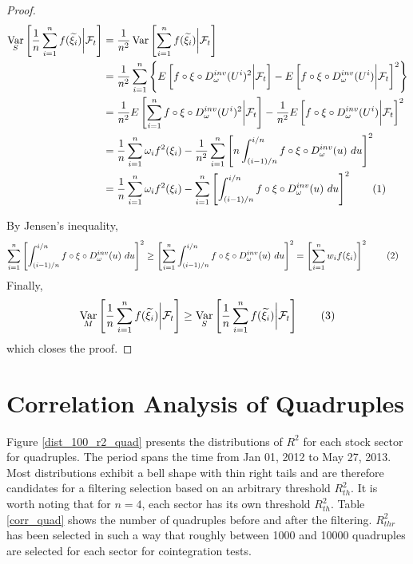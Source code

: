 \documentclass[11pt,a4,twosided,singlespacing,titlepagenumber=on]{scrreprt}
\numberwithin{equation}{chapter} %
\theoremstyle{remark}
\DeclareMathOperator{\var}{Var}
\newcommand\numberthis{\addtocounter{equation}{1}\tag{\theequation}}
\begin{document}
\begin{proof}
\begin{align*}
\var_S \left[ \frac{1}{n} \sum_{i=1}^n f(\widetilde{\xi_i}) \bigg| \mathcal{F}_t \right] &= \frac{1}{n^2} \var \left[ \sum_{i=1}^n f(\widetilde{\xi_i}) \bigg| \mathcal{F}_t \right] \\
																					  &= \frac{1}{n^2} \sum_{i=1}^n \left\{ E \left[ f \circ \xi \circ D_\omega^{inv}(U^i)^2 \bigg| \mathcal{F}_t \right] - E \left[ f \circ \xi \circ D_\omega^{inv}(U^i) \bigg| \mathcal{F}_t \right]^2 \right\}\\
																					  &= \frac{1}{n^2} E \left[ \sum_{i=1}^n f \circ \xi \circ D_\omega^{inv}(U^i)^2 \bigg| \mathcal{F}_t \right] - \frac{1}{n^2} E \left[ f \circ \xi \circ D_\omega^{inv}(U^i) \bigg| \mathcal{F}_t \right]^2 \\
																					  &= \frac{1}{n} \sum_{i=1}^n \omega_i f^2(\xi_i) - \frac{1}{n^2} \sum_{i=1}^n \left[ n \int_{(i-1)/n}^{i/n} f \circ \xi \circ D_\omega^{inv}(u)\text{ }du\right]^2 \\
																					  &= \frac{1}{n} \sum_{i=1}^n \omega_i f^2(\xi_i) - \sum_{i=1}^n \left[ \int_{(i-1)/n}^{i/n} f \circ \xi \circ D_\omega^{inv}(u)\text{ }du\right]^2 \numberthis
\end{align*}

By Jensen's inequality,
\begin{align*}
\sum_{i=1}^n \left[ \int_{(i-1)/n}^{i/n} f \circ \xi \circ D_\omega^{inv}(u)\text{ }du\right]^2 &\geq \left[\sum_{i=1}^n \int_{(i-1)/n}^{i/n} f \circ \xi \circ D_\omega^{inv}(u)\text{ }du\right]^2 = \left[ \sum_{i=1}^n w_i f(\xi_i)\right]^2 \numberthis
\end{align*}
Finally,
\begin{equation}
\var_M \left[ \frac{1}{n} \sum_{i=1}^n f(\widetilde{\xi_i}) \bigg| \mathcal{F}_t \right] \geq \var_S \left[ \frac{1}{n} \sum_{i=1}^n f(\widetilde{\xi_i}) \bigg| \mathcal{F}_t \right] \numberthis
\end{equation}
which closes the proof.
\end{proof}

\section{Correlation Analysis of Quadruples}
\label{sec:corr_analysis_quad}
Figure \ref{dist_100_r2_quad} presents the distributions of $R^2$ for each stock sector for quadruples. The period spans the time from Jan 01, 2012 to May 27, 2013. Most distributions exhibit a bell shape with thin right tails and are therefore candidates for a filtering selection based on an arbitrary threshold $R^2_{th}$. It is worth noting that for $n=4$, each sector has its own threshold $R^2_{th}$. Table \ref{corr_quad} shows the number of quadruples before and after the filtering. $R^2_{thr}$ has been selected in such a way that roughly between 1000 and 10000 quadruples are selected for each sector for cointegration tests.
\end{document}
